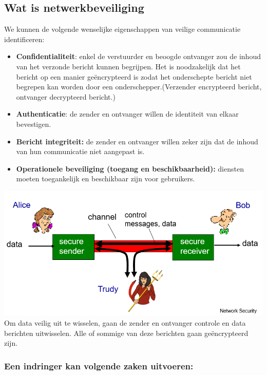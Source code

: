 \subsection{Wat is netwerkbeveiliging}

We kunnen de volgende wenselijke eigenschappen van veilige communicatie identificeren:
\begin{itemize}
    \item \textbf{Confidentialiteit}: enkel de verstuurder en beoogde ontvanger zou de inhoud van het verzonde bericht kunnen begrijpen. Het is noodzakelijk dat het bericht op een manier geëncrypteerd is zodat het onderschepte bericht niet begrepen kan worden door een onderschepper.(Verzender encrypteerd bericht, ontvanger decrypteerd bericht.)
    \item \textbf{Authenticatie}: de zender en ontvanger willen de identiteit van elkaar bevestigen.
    \item \textbf{Bericht integriteit:} de zender en ontvanger willen zeker zijn dat de inhoud van hun communicatie niet aangepast is.
    \item \textbf{Operationele beveiliging (toegang en beschikbaarheid):} diensten moeten toegankelijk en beschikbaar zijn voor gebruikers.
\end{itemize}

\includegraphics[width=7in]{./img/imghfdst8/hfdst8puntje1.png}\\[1cm]
Om data veilig uit te wisselen, gaan de zender en ontvanger controle en data berichten uitwisselen. Alle of sommige van deze berichten gaan geëncrypteerd zijn. 

\subsubsection{Een indringer kan volgende zaken uitvoeren:}

